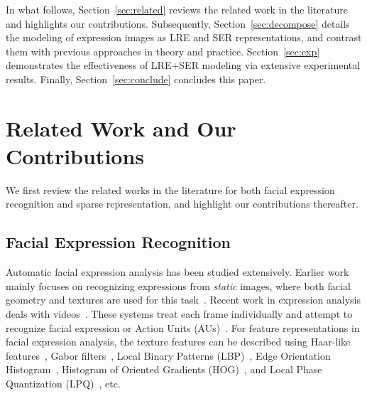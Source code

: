 \documentclass[journal]{IEEEtran}
\begin{document}
In what follows, Section~\ref{sec:related} reviews the related work in the literature and highlights our contributions. Subsequently, Section~\ref{sec:decompose} details the modeling of expression images as LRE and SER representations, and contrast them with previous approaches in theory and practice.  Section~\ref{sec:exp} demonstrates the effectiveness of LRE+SER modeling via extensive experimental results. Finally, Section~\ref{sec:conclude} concludes this paper.



\section{Related Work and Our Contributions\label{sec:related}}

We first review the related works in the literature for both facial expression recognition and sparse representation, and highlight our contributions thereafter. 

\subsection{Facial Expression Recognition}

Automatic facial expression analysis has been studied extensively. Earlier work mainly focuses on recognizing expressions from \textit{static} images, where both facial geometry and textures are used for this task~\cite{Pantic_PAMI00,Essa_PAMI97,Donato_PAMI99}. Recent work in expression analysis deals with videos~\cite{Bartlett_FG11,Kaliouby_SMC04,Valstar_FERA11}. These systems treat each frame individually and attempt to recognize facial expression or Action Units (AUs)~\cite{Ekman78}. For feature representations in facial expression analysis, the texture features can be described using Haar-like features~\cite{Whitehill_FG06}, Gabor filters~\cite{Lyons_PAMI99,Bartlett_FG11}, Local Binary Patterns (LBP)~\cite{Shan_IVC09,Jiang_FG11}, Edge Orientation Histogram~\cite{Levi_CVPR04}, Histogram of Oriented Gradients (HOG)~\cite{Dalal_CVPR05,Dhall_FERA11,Dahmane_FERA11}, and Local Phase Quantization (LPQ)~\cite{LPQ}, etc.
\end{document}
